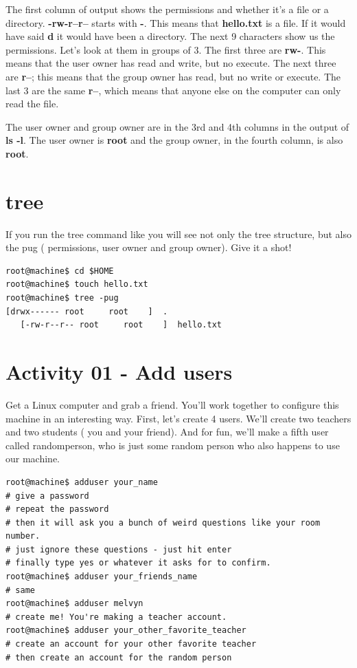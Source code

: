 \documentclass[12pt,a4]{article}
\begin{document}
The first column of output shows the permissions and whether it's a file or a directory. \textbf{-rw-r--r--} starts with \textbf{-}. This means that \textbf{hello.txt} is a file. If it would have said \textbf{d} it would have been a directory. The next 9 characters show us the permissions. Let's look at them in groups of 3. The first three are \textbf{rw-}. This means that the user owner has read and write, but no execute. The next three are \textbf{r--}; this means that the group owner has read, but no write or execute. The last 3 are the same \textbf{r--}, which means that anyone else on the computer can only read the file.

The user owner and group owner are in the 3rd and 4th columns in the output of \textbf{ls -l}. The user owner is \textbf{root} and the group owner, in the fourth column, is also \textbf{root}. 

\section{tree}
If you run the tree command like  you will see not only the tree structure, but also the pug ( permissions, user owner and group owner). Give it a shot!

\begin{lstlisting}[style=Term, label=listing:awk, caption={tree -pug gives similar information to ls -l}]
root@machine$ cd $HOME
root@machine$ touch hello.txt
root@machine$ tree -pug
[drwx------ root     root    ]  .
   [-rw-r--r-- root     root    ]  hello.txt
\end{lstlisting}


\section{Activity 01 - Add users}
Get a Linux computer and grab a friend. You'll work together to configure this machine in an interesting way.
First, let's create 4 users. We'll create two teachers and two students ( you and your friend). And for fun, we'll make a fifth user called randomperson, who is just some random person who also happens to use our machine.

\begin{lstlisting}[style=Term, label=listing:awk, caption={create users}]
root@machine$ adduser your_name
# give a password
# repeat the password
# then it will ask you a bunch of weird questions like your room number. 
# just ignore these questions - just hit enter
# finally type yes or whatever it asks for to confirm.
root@machine$ adduser your_friends_name
# same
root@machine$ adduser melvyn
# create me! You're making a teacher account.
root@machine$ adduser your_other_favorite_teacher
# create an account for your other favorite teacher
# then create an account for the random person
\end{lstlisting}
\end{document}
